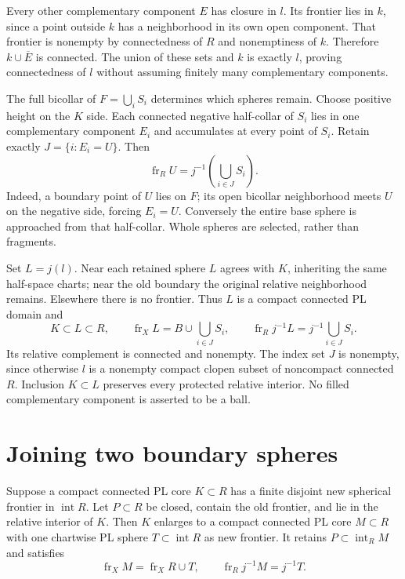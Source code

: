Every other complementary component $E$ has closure in $l$. Its frontier
lies in $k$, since a point outside $k$ has a neighborhood in its own open
component. That frontier is nonempty by connectedness of $R$ and
nonemptiness of $k$. Therefore $k\cup\overline E$ is connected.
The union of these sets and $k$ is exactly $l$, proving connectedness of
$l$ without assuming finitely many complementary components.

The full bicollar of $F=\bigcup_iS_i$ determines which spheres remain.
Choose positive height on the $K$ side. Each connected negative half-collar
of $S_i$ lies in one complementary component $E_i$ and accumulates at every
point of $S_i$. Retain exactly $J=\{i:E_i=U\}$. Then
\[
 \operatorname{fr}_R U=j^{-1}\left(\bigcup_{i\in J}S_i\right).
\]
Indeed, a boundary point of $U$ lies on $F$; its open bicollar neighborhood
meets $U$ on the negative side, forcing $E_i=U$. Conversely the entire
base sphere is approached from that half-collar. Whole spheres are
selected, rather than fragments.

Set $L=j(l)$. Near each retained sphere $L$ agrees with $K$, inheriting
the same half-space charts; near the old boundary the original relative
neighborhood remains. Elsewhere there is no frontier. Thus $L$ is a
compact connected PL domain and
\[
 K\subset L\subset R,\qquad
 \operatorname{fr}_X L=B\cup\bigcup_{i\in J}S_i,
 \qquad\operatorname{fr}_R j^{-1}L=j^{-1}\bigcup_{i\in J}S_i.
\]
Its relative complement is connected and nonempty. The index set $J$ is
nonempty, since otherwise $l$ is a nonempty compact clopen subset of
noncompact connected $R$. Inclusion $K\subset L$ preserves every protected
relative interior. No filled complementary component is asserted to be a ball.

\section{Joining two boundary spheres}
\label{sec:sphere-merging}

\begin{theorem}
\label{thm:compact-single-sphere}
Suppose a compact connected PL core $K\subset R$ has a finite disjoint
new spherical frontier in $\operatorname{int}R$. Let $P\subset R$ be
closed, contain the old frontier, and lie in the relative interior of
$K$. Then $K$ enlarges to a compact connected PL core $M\subset R$
with one chartwise PL sphere $T\subset\operatorname{int}R$ as new
frontier. It retains $P\subset\operatorname{int}_R M$ and satisfies
\[
 \operatorname{fr}_X M=\operatorname{fr}_X R\cup T,
 \qquad \operatorname{fr}_R j^{-1}M=j^{-1}T.
\]
\end{theorem}

